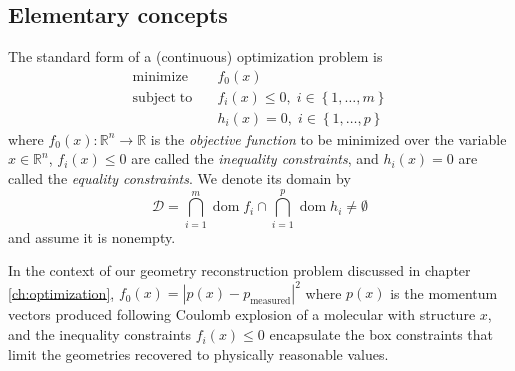\subsection{Elementary concepts}
The standard form of a (continuous) optimization problem is
\begin{align} \label{eq:op}
\mathrm{minimize}   \quad & f_0(x) \nonumber \\
\mathrm{subject\;to} \quad &
f_i(x) \leq 0, \; i \in \left\{1, \dots, m \right\}\\
& h_i(x) = 0, \; i \in \left\{1, \dots, p \right\} \nonumber
\end{align}
where $f_0(x): \mathbb{R}^n \rightarrow \mathbb{R}$ is the \emph{objective function} to be minimized over the variable $x \in \mathbb{R}^n$, $f_i(x) \leq 0$ are called the \emph{inequality constraints}, and $h_i(x) = 0$ are called the \emph{equality constraints}. We denote its domain by
\begin{equation}
\mathcal{D} = \bigcap_{i=1}^m \operatorname{dom} f_i \cap \bigcap_{i=1}^p \operatorname{dom} h_i \neq \emptyset
\end{equation}
and assume it is nonempty.

In the context of our geometry reconstruction problem discussed in chapter \ref{ch:optimization}, $f_0(x) = |p(x)-p_\textrm{measured}|^2$ where $p(x)$ is the momentum vectors produced following Coulomb explosion of a molecular with structure $x$, and the inequality constraints $f_i(x) \leq 0$ encapsulate the box constraints that limit the geometries recovered to physically reasonable values.


